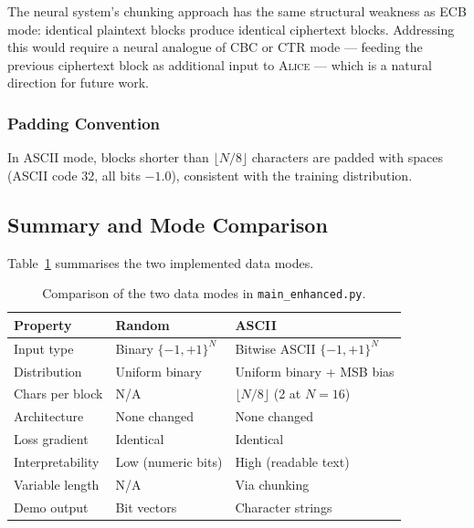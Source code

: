 \documentclass[12pt, a4paper]{article}
\newcommand{\alice}{\textsc{Alice}}
\newcommand{\code}[1]{\texttt{\color{CodeRed}#1}}
\begin{document}
\noindent The neural system's chunking approach has the same
structural weakness as ECB mode: identical plaintext blocks
produce identical ciphertext blocks. Addressing this would require
a neural analogue of CBC or CTR mode --- feeding the previous
ciphertext block as additional input to \alice{} --- which is
a natural direction for future work.

\subsubsection*{Padding Convention}

In ASCII mode, blocks shorter than $\lfloor N/8 \rfloor$ characters are padded
with spaces (ASCII code 32, all bits $-1.0$), consistent with the
training distribution.

\subsection{Summary and Mode Comparison}
\label{subsec:mode_summary}

Table~\ref{tab:mode_summary} summarises the two implemented data modes.

\begin{table}[H]
  \centering
  \caption{Comparison of the two data modes in \code{main\_enhanced.py}.}
  \label{tab:mode_summary}
  \renewcommand{\arraystretch}{1.5}
  \begin{tabularx}{\linewidth}{@{} l X X @{}}
    \toprule
    \textbf{Property} & \textbf{Random} & \textbf{ASCII} \\
    \midrule
    Input type       & Binary $\{-1,+1\}^N$        & Bitwise ASCII $\{-1,+1\}^N$ \\[4pt]
    Distribution     & Uniform binary               & Uniform binary + MSB bias \\[4pt]
    Chars per block  & N/A                          & $\lfloor N/8 \rfloor$ (2 at $N=16$) \\[4pt]
    Architecture     & None changed                 & None changed \\[4pt]
    Loss gradient    & Identical                    & Identical \\[4pt]
    Interpretability & Low (numeric bits)           & High (readable text) \\[4pt]
    Variable length  & N/A                          & Via chunking \\[4pt]
    Demo output      & Bit vectors                  & Character strings \\
    \bottomrule
  \end{tabularx}
\end{table}
\end{document}
